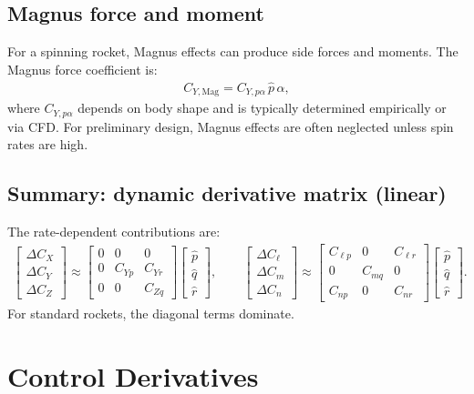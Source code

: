 \documentclass[11pt]{article}
\begin{document}
\subsection{Magnus force and moment}
For a spinning rocket, Magnus effects can produce side forces and moments. The Magnus force coefficient is:
\begin{align}
C_{Y,\text{Mag}} = C_{Y,p\alpha}\,\hat p\,\alpha,
\end{align}
where $C_{Y,p\alpha}$ depends on body shape and is typically determined empirically or via CFD. For preliminary design, Magnus effects are often neglected unless spin rates are high.

\subsection{Summary: dynamic derivative matrix (linear)}
The rate-dependent contributions are:
\begin{align}
\begin{bmatrix}\Delta C_X\\\Delta C_Y\\\Delta C_Z\end{bmatrix}
\approx
\begin{bmatrix}
0 & 0 & 0\\
0 & C_{Yp} & C_{Yr}\\
0 & 0 & C_{Zq}
\end{bmatrix}
\begin{bmatrix}\hat p\\\hat q\\\hat r\end{bmatrix},
\qquad
\begin{bmatrix}\Delta C_\ell\\\Delta C_m\\\Delta C_n\end{bmatrix}
\approx
\begin{bmatrix}
C_{\ell p} & 0 & C_{\ell r}\\
0 & C_{mq} & 0\\
C_{np} & 0 & C_{nr}
\end{bmatrix}
\begin{bmatrix}\hat p\\\hat q\\\hat r\end{bmatrix}.
\end{align}
For standard rockets, the diagonal terms dominate.

\section{Control Derivatives}
\end{document}
